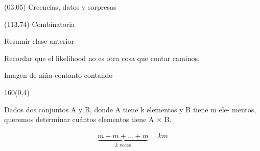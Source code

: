 \documentclass[shownotes,aspectratio=169]{beamer}
\newif\ifes
\newcommand{\es}[1]{\ifes#1\fi}
\begin{document}
\color{black!85}
\large

 

\begin{frame}
 
 \begin{textblock}{90}(03,05)
 \centering \huge  \textcolor{black!40}{Creencias, datos y sorpresas}
\end{textblock}

 \begin{textblock}{47}(113,74)
\centering \Large  \textcolor{white!55}{Combinatoria}
\end{textblock}

{}
\end{frame}

\begin{frame}[plain]
 
 \centering
 Resumir clase anterior
 
\end{frame}

\begin{frame}[plain]
 
 \centering
 Recordar que el likelihood no es otra cosa que contar caminos.
 
\end{frame}

\begin{frame}[plain]
 
 \centering
 Imagen de niña contanto contando
 
\end{frame}

\begin{frame}[plain]
\begin{textblock}{160}(0,4)
 \centering \LARGE 
 \es{Conjunto de pares ordenados}
 \end{textblock}
 \vspace{1cm}

 Dados dos conjuntos A y B, donde A tiene k elementos y B tiene m ele-
mentos, queremos determinar cuántos elementos tiene A $\times$ B.

\begin{align*}
\underbrace{m + m + \dots + m}_{k \text{ veces}} = km
\end{align*}
 
\end{frame}
\end{document}

